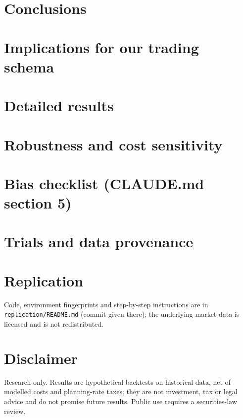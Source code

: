 \documentclass[11pt]{article}
\begin{document}
\section{Conclusions}

\section{Implications for our trading schema}

\label{mainend}
\clearpage
\appendix
\section{Detailed results}
\section{Robustness and cost sensitivity}
\section{Bias checklist (CLAUDE.md section 5)}
\section{Trials and data provenance}
\section{Replication}
Code, environment fingerprints and step-by-step instructions are in \texttt{replication/README.md}
(commit given there); the underlying market data is licensed and is not redistributed.
\section{Disclaimer}
Research only. Results are hypothetical backtests on historical data, net of modelled costs and
planning-rate taxes; they are not investment, tax or legal advice and do not promise future results.
Public use requires a securities-law review.



\end{document}
